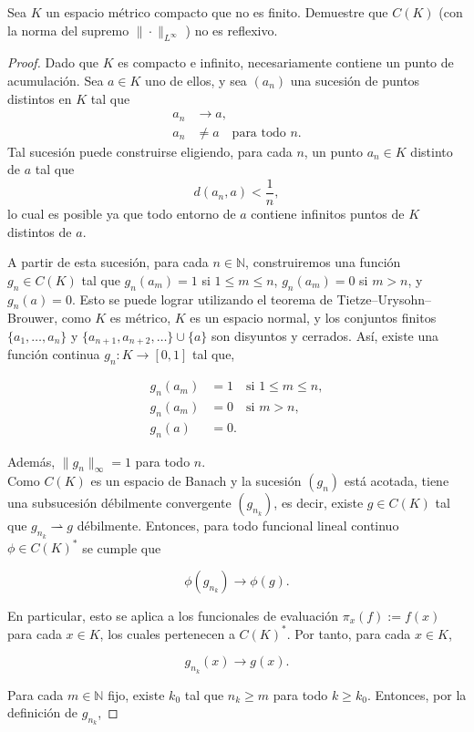  Sea $K$ un espacio métrico compacto que no es finito. Demuestre que $C(K)$ (con la norma del supremo $\|\cdot\|_{L^{\infty}}$ ) no es reflexivo.
 \begin{proof}
Dado que $K$ es compacto e infinito, necesariamente contiene un punto de acumulación. Sea $a \in K$ uno de ellos, y sea $(a_n)$ una sucesión de puntos distintos en $K$ tal que
\begin{align*}
  a_n &\to a, \\
  a_n &\neq a \quad \text{para todo } n.
\end{align*}
Tal sucesión puede construirse eligiendo, para cada $n$, un punto $a_n \in K$ distinto de $a$ tal que
\[
d(a_n, a) < \frac{1}{n},
\]
lo cual es posible ya que todo entorno de $a$ contiene infinitos puntos de $K$ distintos de $a$.


A partir de esta sucesión, para cada $n \in \mathbb{N}$, construiremos una función $g_n \in C(K)$ tal que $g_n(a_m) = 1$ si $1 \leq m \leq n$, $g_n(a_m) = 0$ si $m > n$, y $g_n(a) = 0$. Esto se puede lograr utilizando el teorema de Tietze–Urysohn–Brouwer, como $K$ es métrico, $K$ es un espacio normal, y los conjuntos finitos $\{a_1, \dots, a_n\}$ y $\{a_{n+1}, a_{n+2}, \dots\} \cup \{a\}$ son disyuntos y cerrados. Así, existe una función continua $g_n : K \to [0,1]$ tal que,

\begin{align*}
  g_n(a_m) &= 1 \quad \text{si } 1 \leq m \leq n, \\
  g_n(a_m) &= 0 \quad \text{si } m > n, \\
  g_n(a)   &= 0.
\end{align*}

Además, $\|g_n\|_\infty = 1$ para todo $n$. \\
Como \( C(K) \) es un espacio de Banach y la sucesión $(g_n)$ está acotada, tiene una subsucesión débilmente convergente $(g_{n_k})$, es decir, existe $g \in C(K)$ tal que $g_{n_k} \rightharpoonup g$ débilmente. Entonces, para todo funcional lineal continuo $\phi \in C(K)^*$ se cumple que

\[
\phi(g_{n_k}) \to \phi(g).
\]

En particular, esto se aplica a los funcionales de evaluación $\pi_x(f) := f(x)$ para cada $x \in K$, los cuales pertenecen a $C(K)^*$. Por tanto, para cada $x \in K$,

\[
g_{n_k}(x) \to g(x).
\]

Para cada $m \in \mathbb{N}$ fijo, existe $k_0$ tal que $n_k \geq m$ para todo $k \geq k_0$. Entonces, por la definición de $g_{n_k}$,


\end{proof}
